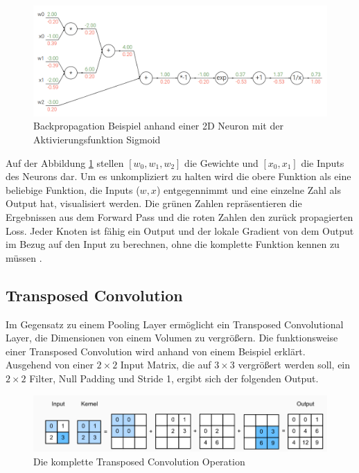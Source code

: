 \begin{figure}[H]
  \centering
  \includegraphics[width=1\textwidth]{resources/cnn/backpropagation.png}
  \caption{
    Backpropagation Beispiel anhand einer 2D Neuron mit der Aktivierungsfunktion Sigmoid
    \cite{backpropagation}
  }
  \label{image:backpropagation}
\end{figure}

Auf der Abbildung \ref{image:backpropagation} stellen $ [w_0, w_1, w_2] $ die Gewichte und $ [x_0, x_1] $ die Inputs des Neurons dar. 
Um es unkompliziert zu halten wird die 
obere Funktion als eine beliebige Funktion, die Inputs ($w, x$) entgegennimmt und eine einzelne Zahl als Output hat, visualisiert werden. 
Die grünen Zahlen repräsentieren die Ergebnissen aus dem Forward Pass und die roten Zahlen den zurück propagierten Loss. Jeder Knoten ist fähig 
ein Output und der lokale Gradient von dem Output im Bezug auf den Input zu berechnen, ohne die komplette Funktion kennen zu müssen \cite{cs231-backpropagation}.

\subsection{Transposed Convolution}
Im Gegensatz zu einem Pooling Layer ermöglicht ein Transposed Convolutional Layer, die Dimensionen von einem Volumen zu vergrößern. 
Die funktionsweise einer Transposed Convolution wird anhand von einem Beispiel erklärt. 
\\
Ausgehend von einer $ 2 \times 2 $ Input Matrix, die auf $ 3 \times 3 $ vergrößert werden soll, ein $ 2 \times 2 $ Filter, 
Null Padding und Stride 1, ergibt sich der folgenden Output. 

\begin{figure}[H]
  \centering
  \includegraphics[width=1\textwidth]{resources/cnn/transposed-conv.png}
  \caption{
    Die komplette Transposed Convolution Operation
    \cite{zhang2020dive}
  }
  \label{image:transposed-conv}
\end{figure}


